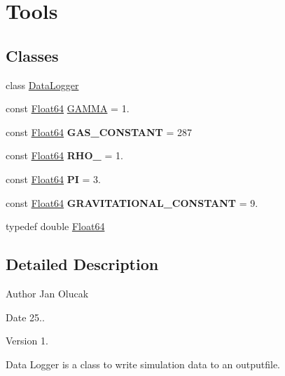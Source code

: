 \hypertarget{group___tools}{}\section{Tools}
\label{group___tools}
\subsection*{Classes}
\begin{DoxyCompactItemize}
\item 
class \hyperlink{group___tools_class_data_logger}{Data\+Logger}
\end{DoxyCompactItemize}
\begin{DoxyCompactItemize}
\item 
const \hyperlink{group___tools_ga3f1431cb9f76da10f59246d1d743dc2c}{Float64} \hyperlink{group___tools_ga6e7b8e4a71fb3f6d37718ac5d614f560}{G\+A\+M\+MA} = 1.
\item 
\mbox{\label{group___tools_ga50141cecfc14099c41bee22b4f166637}} 
const \hyperlink{group___tools_ga3f1431cb9f76da10f59246d1d743dc2c}{Float64} {\bfseries G\+A\+S\+\_\+\+C\+O\+N\+S\+T\+A\+NT} = 287
\item 
\mbox{\label{group___tools_ga4350dd604b08011751eaca3d76213582}} 
const \hyperlink{group___tools_ga3f1431cb9f76da10f59246d1d743dc2c}{Float64} {\bfseries R\+H\+O\+\_} = 1.
\item 
\mbox{\label{group___tools_gac3a28ac509d7e1dff951cc777889cc93}} 
const \hyperlink{group___tools_ga3f1431cb9f76da10f59246d1d743dc2c}{Float64} {\bfseries PI} = 3.
\item 
\mbox{\label{group___tools_gad0d838a1206faf55a621d5ec8f1e896d}} 
const \hyperlink{group___tools_ga3f1431cb9f76da10f59246d1d743dc2c}{Float64} {\bfseries G\+R\+A\+V\+I\+T\+A\+T\+I\+O\+N\+A\+L\+\_\+\+C\+O\+N\+S\+T\+A\+NT} = 9.
\end{DoxyCompactItemize}
\begin{DoxyCompactItemize}
\item 
typedef double \hyperlink{group___tools_ga3f1431cb9f76da10f59246d1d743dc2c}{Float64}
\end{DoxyCompactItemize}


\subsection{Detailed Description}
\begin{DoxyAuthor}{Author}
Jan Olucak 
\end{DoxyAuthor}
\begin{DoxyDate}{Date}
25.. 
\end{DoxyDate}
\begin{DoxyVersion}{Version}
1.
\end{DoxyVersion}
Data Logger is a class to write simulation data to an outputfile. 

